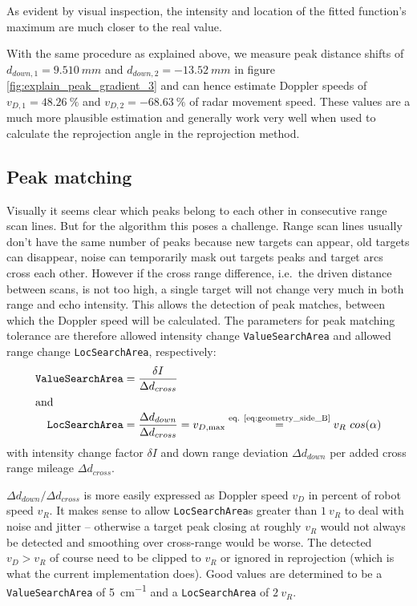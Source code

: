 As evident by visual inspection, the intensity and location of the
fitted function's maximum are much closer to the real value.

With the same procedure as explained above, we measure peak distance
shifts of \(d_{down,1}=\SI{9.510}{mm}\) and \(d_{down,2}=-\SI{13.52}{mm}\) in figure
\cref{fig:explain_peak_gradient_3} and can hence estimate Doppler speeds of \(v_{D,1}=\SI{48.26}{\%}\) and
\(v_{D,2}=-\SI{68.63}{\%}\) of radar movement speed. These values are a much
more plausible estimation and generally work very well when used to
calculate the reprojection angle in the reprojection method.

\subsection{Peak matching}\label{peak-matching}

Visually it seems clear which peaks belong to each other in consecutive
range scan lines. But for the algorithm this poses a challenge. Range
scan lines usually don't have the same number of peaks because new
targets can appear, old targets can disappear, noise can temporarily
mask out targets peaks and target arcs cross each other. However if the
cross range difference, i.e.~the driven distance between scans, is not
too high, a single target will not change very much in both range and
echo intensity. This allows the detection of peak matches, between which
the Doppler speed will be calculated. The parameters for peak matching
tolerance are therefore allowed intensity change \texttt{ValueSearchArea} and allowed range change \texttt{LocSearchArea}, respectively:
\begin{align}
    \text{\texttt{ValueSearchArea}} &= \frac{\delta I}{\Delta d_{cross}}\\
\intertext{and}
    \text{\texttt{LocSearchArea}} &= \frac{\Delta d_{down}}{\Delta d_{cross}} = v_{D,\max} \stackrel{\text{eq. \ref{eq:geometry_side_B}}}{=} v_R~cos(\alpha)
\end{align}
with intensity change factor $\delta I$ and down range deviation $\Delta d_{down}$ per added cross range mileage $\Delta d_{cross}$.

$\Delta d_{down} / \Delta d_{cross}$ is more easily expressed as Doppler speed \(v_D\) in percent of robot speed \(v_R\). It makes sense to allow \texttt{LocSearchArea}s greater than $1~v_R$ to deal with noise and jitter -- otherwise a target peak closing at roughly $v_R$ would not always be detected and smoothing over cross-range would be worse. The detected $v_D > v_R$ of course need to be clipped to $v_R$ or ignored in reprojection (which is what the current implementation does). Good values are determined to be a \texttt{ValueSearchArea} of \SI{5}{cm^{-1}} and a \texttt{LocSearchArea} of \(2~v_R\).

